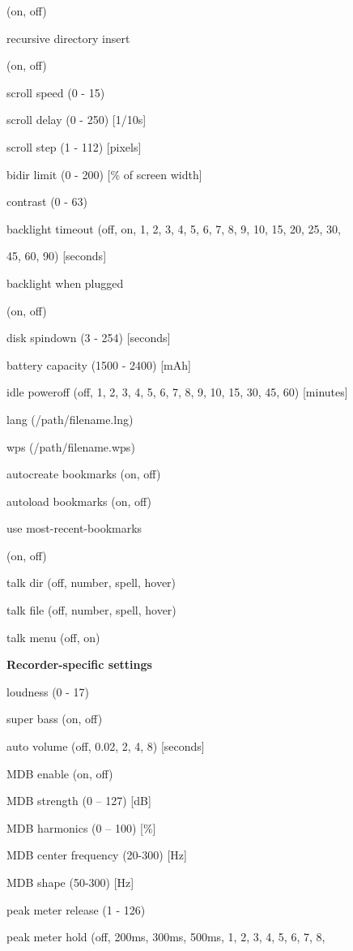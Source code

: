    (on, off)

recursive directory insert

    (on, off)

scroll speed  (0 {}- 15) 

scroll delay   (0 {}- 250) [1/10s]

scroll step   (1 {}- 112) [pixels]

bidir limit   (0 {}- 200) [\% of screen width]

contrast   (0 {}- 63)

backlight timeout  (off, on, 1, 2, 3, 4, 5, 6, 7, 8, 9, 10, 15, 20, 25,
30, 

     45, 60, 90) [seconds]

backlight when plugged 

    (on, off)

disk spindown  (3 {}- 254) [seconds]

battery capacity  (1500 {}- 2400) [mAh]

idle poweroff  (off, 1, 2, 3, 4, 5, 6, 7, 8, 9, 10, 15, 30, 45, 60)     
 [minutes]

lang    (/path/filename.lng)

wps    (/path/filename.wps)

autocreate bookmarks (on, off)

autoload bookmarks (on, off)

use most{}-recent{}-bookmarks

    (on, off)

talk dir   (off, number, spell, hover)

talk file   (off, number, spell, hover)

talk menu   (off, on)

{\bfseries
Recorder{}-specific settings}

loudness   (0 {}- 17)

super bass    (on, off)

auto volume  (off, 0.02, 2, 4, 8) [seconds]

MDB enable  (on, off)

MDB strength  (0 {--} 127) [dB]

MDB harmonics  (0 {--} 100) [\%]

MDB center frequency (20{}-300) [Hz]

MDB shape   (50{}-300) [Hz]

peak meter release (1 {}- 126)

peak meter hold  (off, 200ms, 300ms, 500ms, 1, 2, 3, 4, 5, 6, 7, 8,

